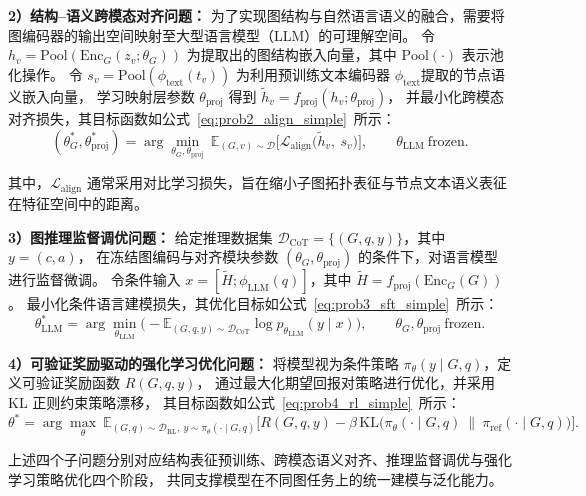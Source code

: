 \textbf{2）结构--语义跨模态对齐问题：}
为了实现图结构与自然语言语义的融合，需要将图编码器的输出空间映射至大型语言模型（LLM）的可理解空间。
令 $h_v = \text{Pool}(\text{Enc}_G(z_v; \theta_G))$ 为提取出的图结构嵌入向量，其中 $\text{Pool}(\cdot)$ 表示池化操作。
令 $s_v = \text{Pool}(\phi_{\text{text}}(t_v))$ 为利用预训练文本编码器 $\phi_{\text{text}}$提取的节点语义嵌入向量，
学习映射层参数 $\theta_{\mathrm{proj}}$ 得到 $\tilde h_v=f_{\mathrm{proj}}(h_v;\theta_{\mathrm{proj}})$，
并最小化跨模态对齐损失，其目标函数如公式~\ref{eq:prob2_align_simple}\ 所示：  
\begin{equation}
(\theta_G^{\ast},\theta_{\mathrm{proj}}^{\ast})
=
\arg\min_{\theta_G,\theta_{\mathrm{proj}}}\ 
\mathbb{E}_{(G,v)\sim\mathcal{D}}
\Big[\mathcal{L}_{\mathrm{align}}\big(\tilde h_v,\ s_v\big)\Big],
\qquad \theta_{\mathrm{LLM}}\ \text{frozen}.
\label{eq:prob2_align_simple}
\end{equation}

其中，$\mathcal{L}_{\mathrm{align}}$ 通常采用对比学习损失，旨在缩小子图拓扑表征与节点文本语义表征在特征空间中的距离。

\textbf{3）图推理监督调优问题：}
给定推理数据集 $\mathcal{D}_{\mathrm{CoT}}=\{(G,q,y)\}$，其中 $y=(c,a)$，
在冻结图编码与对齐模块参数 $(\theta_G,\theta_{\mathrm{proj}})$ 的条件下，对语言模型进行监督微调。
令条件输入 $x=[\tilde H;\phi_{\mathrm{LLM}}(q)]$，其中 $\tilde H=f_{\mathrm{proj}}(\mathrm{Enc}_G(G))$。
最小化条件语言建模损失，其优化目标如公式~\ref{eq:prob3_sft_simple}\ 所示：
\begin{equation}
\theta_{\mathrm{LLM}}^{\ast}
=
\arg\min_{\theta_{\mathrm{LLM}}}
\Big(
-\mathbb{E}_{(G,q,y)\sim\mathcal{D}_{\mathrm{CoT}}}
\log p_{\theta_{\mathrm{LLM}}}(y\mid x)
\Big),
\qquad \theta_G,\theta_{\mathrm{proj}}\ \text{frozen}.
\label{eq:prob3_sft_simple}
\end{equation}

\textbf{4）可验证奖励驱动的强化学习优化问题：}
将模型视为条件策略 $\pi_{\theta}(y\mid G,q)$，定义可验证奖励函数 $R(G,q,y)$，
通过最大化期望回报对策略进行优化，并采用 KL 正则约束策略漂移，
其目标函数如公式~\ref{eq:prob4_rl_simple}\ 所示：
\begin{equation}
\theta^{\ast}
=
\arg\max_{\theta}\ 
\mathbb{E}_{(G,q)\sim\mathcal{D}_{\mathrm{RL}},\ y\sim\pi_{\theta}(\cdot\mid G,q)}
\Big[
R(G,q,y)
-\beta\,\mathrm{KL}\big(\pi_{\theta}(\cdot\mid G,q)\ \|\ \pi_{\mathrm{ref}}(\cdot\mid G,q)\big)
\Big].
\label{eq:prob4_rl_simple}
\end{equation}

上述四个子问题分别对应结构表征预训练、跨模态语义对齐、推理监督调优与强化学习策略优化四个阶段，
共同支撑模型在不同图任务上的统一建模与泛化能力。


